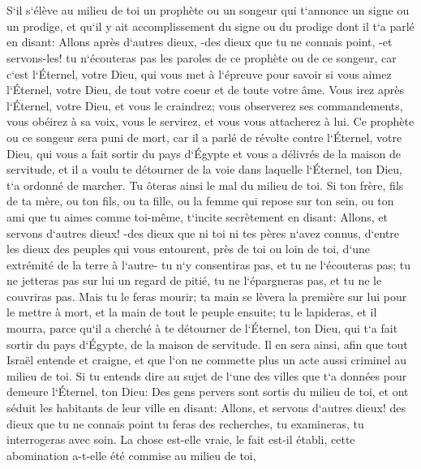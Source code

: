 \chapter{}

\verse S`il s`élève au milieu de toi un prophète ou un songeur qui t`annonce un signe ou un prodige, 
\verse et qu`il y ait accomplissement du signe ou du prodige dont il t`a parlé en disant: Allons après d`autres dieux, -des dieux que tu ne connais point, -et servons-les! 
\verse tu n`écouteras pas les paroles de ce prophète ou de ce songeur, car c`est l`Éternel, votre Dieu, qui vous met à l`épreuve pour savoir si vous aimez l`Éternel, votre Dieu, de tout votre coeur et de toute votre âme. 
\verse Vous irez après l`Éternel, votre Dieu, et vous le craindrez; vous observerez ses commandements, vous obéirez à sa voix, vous le servirez, et vous vous attacherez à lui. 
\verse Ce prophète ou ce songeur sera puni de mort, car il a parlé de révolte contre l`Éternel, votre Dieu, qui vous a fait sortir du pays d`Égypte et vous a délivrés de la maison de servitude, et il a voulu te détourner de la voie dans laquelle l`Éternel, ton Dieu, t`a ordonné de marcher. Tu ôteras ainsi le mal du milieu de toi. 
\verse Si ton frère, fils de ta mère, ou ton fils, ou ta fille, ou la femme qui repose sur ton sein, ou ton ami que tu aimes comme toi-même, t`incite secrètement en disant: Allons, et servons d`autres dieux! -des dieux que ni toi ni tes pères n`avez connus, 
\verse d`entre les dieux des peuples qui vous entourent, près de toi ou loin de toi, d`une extrémité de la terre à l`autre- 
\verse tu n`y consentiras pas, et tu ne l`écouteras pas; tu ne jetteras pas sur lui un regard de pitié, tu ne l`épargneras pas, et tu ne le couvriras pas. 
\verse Mais tu le feras mourir; ta main se lèvera la première sur lui pour le mettre à mort, et la main de tout le peuple ensuite; 
\verse tu le lapideras, et il mourra, parce qu`il a cherché à te détourner de l`Éternel, ton Dieu, qui t`a fait sortir du pays d`Égypte, de la maison de servitude. 
\verse Il en sera ainsi, afin que tout Israël entende et craigne, et que l`on ne commette plus un acte aussi criminel au milieu de toi. 
\verse Si tu entends dire au sujet de l`une des villes que t`a données pour demeure l`Éternel, ton Dieu: 
\verse Des gens pervers sont sortis du milieu de toi, et ont séduit les habitants de leur ville en disant: Allons, et servons d`autres dieux! des dieux que tu ne connais point 
\verse tu feras des recherches, tu examineras, tu interrogeras avec soin. La chose est-elle vraie, le fait est-il établi, cette abomination a-t-elle été commise au milieu de toi, 
